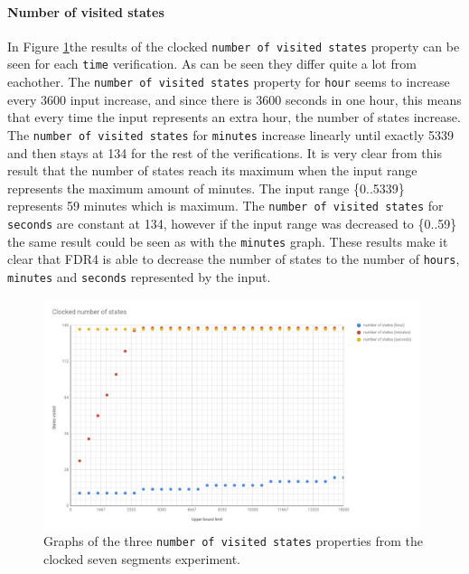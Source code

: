 \paragraph{Number of visited states}
In Figure \ref{fig:clocked_states}the results of the clocked \texttt{number of visited states} property can be seen for each \texttt{time} verification. As can be seen they differ quite a lot from eachother. The \texttt{number of visited states} property for \texttt{hour} seems to increase every 3600 input increase, and since there is 3600 seconds in one hour, this means that every time the input represents an extra hour, the number of states increase. The \texttt{number of visited states} for \texttt{minutes} increase linearly until exactly 5339 and then stays at 134 for the rest of the verifications. It is very clear from this result that the number of states reach its maximum when the input range represents the maximum amount of minutes. The input range \{0..5339\} represents 59 minutes which is maximum. The \texttt{number of visited states} for \texttt{seconds} are constant at 134, however if the input range was decreased to \{0..59\} the same result could be seen as with the \texttt{minutes} graph. These results make it clear that FDR4 is able to decrease the number of states to the number of \texttt{hours}, \texttt{minutes} and \texttt{seconds} represented by the input.
\begin{figure}
    \includegraphics[width=0.98\textwidth]{./figures/temporary_graphs/clocked_number_of_states.jpg}
\caption{Graphs of the three \texttt{number of visited states} properties from the clocked seven segments experiment.}
\label{fig:clocked_states}
\end{figure}
